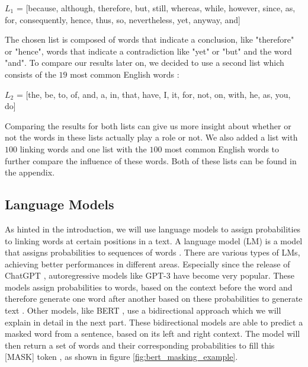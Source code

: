 \begin{center}
	$L_1$ = [because, although, therefore, but, still, whereas, while, however, since, as, for, consequently, hence, thus, so, nevertheless, yet, anyway, and]
\end{center}

The chosen list is composed of words that indicate a conclusion, like "therefore" or "hence", words that indicate a contradiction like "yet" or "but" and the word "and". To compare our results later on, we decided to use a second list which consists of the $19$ most common English words \cite{mostcommon}:
\begin{center}
	$L_2$ = [the, be, to, of, and, a, in, that, have, I, it, for, not, on, with, he, as, you, do]
\end{center}
Comparing the results for both lists can give us more insight about whether or not the words in these lists actually play a role or not. We also added a list with $100$ linking words and one list with the $100$ most common English words to further compare the influence of these words. Both of these lists can be found in the appendix.

\subsection{Language Models}
As hinted in the introduction, we will use language models to assign probabilities to linking words at certain positions in a text. A language model (LM) is a model that assigns probabilities to sequences of words \cite{languagemodels2023}. There are various types of LMs, achieving better performances in different areas. Especially since the release of ChatGPT \cite{chatgpt}, autoregressive models like GPT-3 have become very popular. These models assign probabilities to words, based on the context before the word and therefore generate one word after another based on these probabilities to generate text \cite{gpt3}. Other models, like BERT \cite{bert}, use a bidirectional approach which we will explain in detail in the next part. These bidirectional models are able to predict a masked word from a sentence, based on its left and right context. The model will then return a set of words and their corresponding probabilities to fill this [MASK] token \cite{bert}, as shown in figure \ref{fig:bert_masking_example}.

